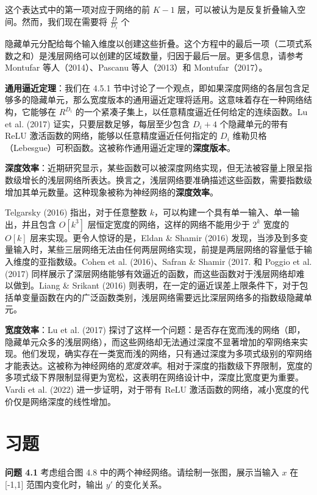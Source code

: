 这个表达式中的第一项对应于网络的前 \(K - 1\) 层，可以被认为是反复折叠输入空间。然而，我们现在需要将 \(\frac{D}{D_i}\) 个

隐藏单元分配给每个输入维度以创建这些折叠。这个方程中的最后一项（二项式系数之和）是浅层网络可以创建的区域数量，归因于最后一层。更多信息，请参考 Montufar 等人（2014）、Pascanu 等人（2013）和 Montufar（2017）。

\textbf{通用逼近定理}：我们在 4.5.1 节中讨论了一个观点，即如果深度网络的各层包含足够多的隐藏单元，那么宽度版本的通用逼近定理将适用。这意味着存在一种网络结构，它能够在 \(R^{D_i}\) 的一个紧凑子集上，以任意精度逼近任何给定的连续函数。Lu et al. (2017) 证实，只要层数足够，每层至少包含 \(D_i + 4\) 个隐藏单元的带有 ReLU 激活函数的网络，能够以任意精度逼近任何指定的 \(D_i\) 维勒贝格（Lebesgue）可积函数。这被称作通用逼近定理的\textbf{深度版本}。

\textbf{深度效率}：近期研究显示，某些函数可以被深度网络实现，但无法被容量上限呈指数级增长的浅层网络所表达。换言之，浅层网络要准确描述这些函数，需要指数级增加其单元数量。这种现象被称为神经网络的\textbf{深度效率}。

Telgarsky (2016) 指出，对于任意整数 \(k\)，可以构建一个具有单一输入、单一输出，并且包含 \(O[k^3]\) 层恒定宽度的网络，这样的网络不能用少于 \(2^k\) 宽度的 \(O[k]\) 层来实现。更令人惊讶的是，Eldan \& Shamir (2016) 发现，当涉及到多变量输入时，某些三层网络无法由任何两层网络实现，前提是两层网络的容量低于输入维度的亚指数级。Cohen et al. (2016)、Safran \& Shamir (2017. 和 Poggio et al. (2017) 同样展示了深层网络能够有效逼近的函数，而这些函数对于浅层网络却难以做到。Liang \& Srikant (2016) 则表明，在一定的逼近误差上限条件下，对于包括单变量函数在内的广泛函数类别，浅层网络需要远比深层网络多的指数级隐藏单元。

\textbf{宽度效率}：Lu et al. (2017) 探讨了这样一个问题：是否存在宽而浅的网络（即，隐藏单元众多的浅层网络），而这些网络却无法通过深度不显著增加的窄网络来实现。他们发现，确实存在一类宽而浅的网络，只有通过深度为多项式级别的窄网络才能表达。这被称为神经网络的\textit{宽度效率}。相对于深度的指数级下界限制，宽度的多项式级下界限制显得更为宽松，这表明在网络设计中，深度比宽度更为重要。Vardi et al. (2022) 进一步证明，对于带有 ReLU 激活函数的网络，减小宽度的代价仅是网络深度的线性增加。

\section{习题}

\textbf{问题 4.1} 考虑组合图 4.8 中的两个神经网络。请绘制一张图，展示当输入 \(x\) 在 [-1,1] 范围内变化时，输出 \(y'\) 的变化关系。



